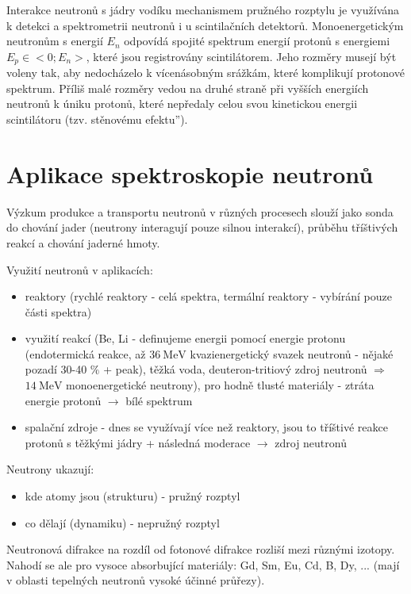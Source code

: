 \documentclass[../../main.tex]{subfiles}
\begin{document}
	Interakce neutronů s jádry vodíku mechanismem pružného rozptylu je využívána k detekci a spektrometrii neutronů i u scintilačních detektorů. Monoenergetickým neutronům s energií $E_n$ odpovídá spojité spektrum energií protonů s energiemi $E_p \in <0; E_n>$, které jsou registrovány scintilátorem. Jeho rozměry musejí být voleny tak, aby nedocházelo k vícenásobným srážkám, které komplikují protonové spektrum. Příliš malé rozměry vedou na druhé straně při vyšších energiích neutronů k úniku protonů, které nepředaly celou svou kinetickou energii scintilátoru (tzv. \quotedblbase stěnovému efektu\textquotedblright).      	
\section{Aplikace spektroskopie neutronů}

Výzkum produkce a transportu neutronů v různých procesech slouží jako sonda do chování jader (neutrony interagují pouze silnou interakcí), průběhu tříštivých reakcí a chování jaderné hmoty.

Využití neutronů v aplikacích:
\begin{itemize}
	\item reaktory (rychlé reaktory - celá spektra, termální reaktory - vybírání pouze části spektra)
	\item využití reakcí (Be, Li - definujeme energii pomocí energie protonu (endotermická reakce, až $36 ~\mathrm{MeV}$ kvazienergetický svazek neutronů - nějaké pozadí 30-40 $\%$ + peak), těžká voda, deuteron-tritiový zdroj neutronů $\Rightarrow$ $14 ~\mathrm{MeV}$ monoenergetické neutrony), pro hodně tlusté materiály - ztráta energie protonů $\rightarrow$ bílé spektrum
	\item spalační zdroje - dnes se využívají více než reaktory, jsou to tříštivé reakce protonů s těžkými jádry + následná moderace $\rightarrow$ zdroj neutronů
\end{itemize}

Neutrony ukazují:
\begin{itemize}
	\item kde atomy jsou (strukturu) - pružný rozptyl
	\item co dělají (dynamiku) - nepružný rozptyl
\end{itemize}

Neutronová difrakce na rozdíl od fotonové difrakce rozliší mezi různými izotopy. Nahodí se ale pro vysoce absorbující materiály: Gd, Sm, Eu, Cd, B, Dy, ... (mají v oblasti tepelných neutronů vysoké účinné průřezy).
\end{document}
